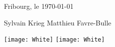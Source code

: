 \vskip 2.5cm
\begin{center}

Fribourg, le \today
\end{center}
\vskip 1.5cm
\begin{center} 
Sylvain Krieg
\hspace{6.45cm}
Matthieu Favre-Bulle
\end{center}
\begin{center} 
\texttt{[image: White]} 
\hspace{4cm}
\texttt{[image: White]} 
\vskip 2.5cm

\end{center}

\newpage
